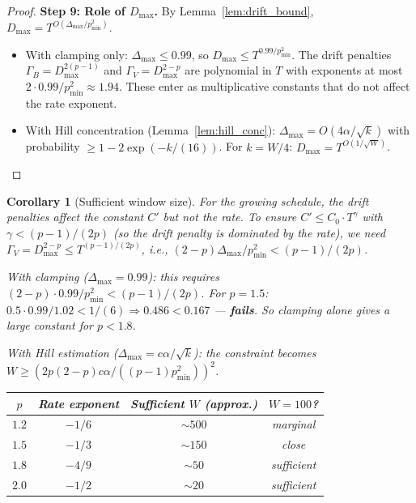 \documentclass[11pt]{article}
\newtheorem{corollary}[theorem]{Corollary}
\theoremstyle{definition}
\begin{document}
\begin{proof}
\textbf{Step 9: Role of $D_{\max}$.}
By Lemma~\ref{lem:drift_bound}, $D_{\max} = T^{O(\Delta_{\max}/p_{\min}^2)}$.
\begin{itemize}[noitemsep]
  \item With clamping only: $\Delta_{\max} \leq 0.99$, so
    $D_{\max} \leq T^{0.99/p_{\min}^2}$. The drift penalties
    $\Gamma_B = D_{\max}^{2(p-1)}$ and $\Gamma_V = D_{\max}^{2-p}$ are
    polynomial in $T$ with exponents at most $2 \cdot 0.99/p_{\min}^2 \approx 1.94$.
    These enter as multiplicative constants that do not affect the rate exponent.
  \item With Hill concentration (Lemma~\ref{lem:hill_conc}):
    $\Delta_{\max} = O(4\alpha/\sqrt{k})$ with probability
    $\geq 1 - 2\exp(-k/(16))$. For $k = W/4$: $D_{\max} = T^{O(1/\sqrt{W})}$.
\end{itemize}
\end{proof}

\begin{corollary}[Sufficient window size]\label{cor:window}
For the growing schedule, the drift penalties affect the constant $C'$
but not the rate. To ensure $C' \leq C_0 \cdot T^{\gamma}$ with
$\gamma < (p-1)/(2p)$ (so the drift penalty is dominated by the rate),
we need $\Gamma_V = D_{\max}^{2-p} \leq T^{(p-1)/(2p)}$, i.e.,
$(2-p)\Delta_{\max}/p_{\min}^2 < (p-1)/(2p)$.

\emph{With clamping} ($\Delta_{\max} = 0.99$): this requires
$(2-p) \cdot 0.99 / p_{\min}^2 < (p-1)/(2p)$. For $p = 1.5$:
$0.5 \cdot 0.99/1.02 < 1/(6) \Rightarrow 0.486 < 0.167$ --- \textbf{fails}.
So clamping alone gives a large constant for $p < 1.8$.

\emph{With Hill estimation} ($\Delta_{\max} = c\alpha/\sqrt{k}$):
the constraint becomes $W \geq (2p(2-p)c\alpha / ((p-1)p_{\min}^2))^2$.

\begin{center}
\renewcommand{\arraystretch}{1.2}
\begin{tabular}{cccc}
\toprule
$p$ & Rate exponent & Sufficient $W$ (approx.) & $W = 100$? \\
\midrule
$1.2$ & $-1/6$ & $\sim 500$ & marginal \\
$1.5$ & $-1/3$ & $\sim 150$ & close \\
$1.8$ & $-4/9$ & $\sim 50$ & sufficient \\
$2.0$ & $-1/2$ & $\sim 20$ & sufficient \\
\bottomrule
\end{tabular}
\end{center}
\end{corollary}
\end{document}
